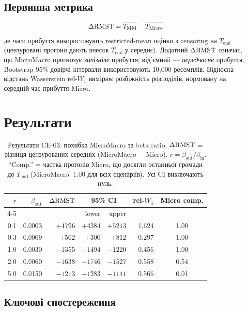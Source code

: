 \documentclass[11pt,a4paper]{article}
\begin{document}
\subsection{Первинна метрика}
\[
  \Delta\mathrm{RMST} = \overline{T_{\text{MM}}} - \overline{T_{\text{Micro}}}
\]
де часи прибуття використовують restricted-mean оцінки з censoring на
$T_{\text{end}}$ (цензуровані прогони дають внесок $T_{\text{end}}$ у середнє).
Додатний $\Delta\mathrm{RMST}$ означає, що MicroMacro прогнозує \emph{запізніле} прибуття;
від'ємний --- \emph{передчасне} прибуття.
Bootstrap 95\% довірчі інтервали використовують 10{,}000 ресемплів.
Відносна відстань Wasserstein $\text{rel-}W_1$ вимірює розбіжність розподілів,
нормовану на середній час прибуття Micro.

\section{Результати}

\begin{table}[H]
\centering
\caption{Результати CE-03: похибка MicroMacro за beta ratio.
  $\Delta\mathrm{RMST}$ = різниця цензурованих середніх (MicroMacro $-$ Micro).
  $r = \beta_{\text{out}}/\beta_{\text{in}}$.
  ``Comp.'' = частка прогонів Micro, що досягли останньої громади
  до $T_{\text{end}}$ (MicroMacro: 1.00 для всіх сценаріїв).
  Усі CI виключають нуль.}
\label{tab:ce03-main}
\begin{tabular}{rrrrrrc}
\toprule
$r$ & $\beta_{\text{out}}$ & $\Delta\mathrm{RMST}$ & \multicolumn{2}{c}{95\% CI} & rel-$W_1$ & Micro comp. \\
\cmidrule(lr){4-5}
 & & & lower & upper & & \\
\midrule
0.1 & 0.0003 & $+4796$ & $+4384$ & $+5213$ & 1.624 & 1.00 \\
0.3 & 0.0009 & $+562$  & $+300$  & $+812$  & 0.297 & 1.00 \\
1.0 & 0.0030 & $-1355$ & $-1494$ & $-1220$ & 0.456 & 1.00 \\
2.0 & 0.0060 & $-1638$ & $-1746$ & $-1527$ & 0.558 & 0.54 \\
5.0 & 0.0150 & $-1213$ & $-1283$ & $-1141$ & 0.566 & 0.01 \\
\bottomrule
\end{tabular}
\end{table}

\subsection{Ключові спостереження}
\end{document}
